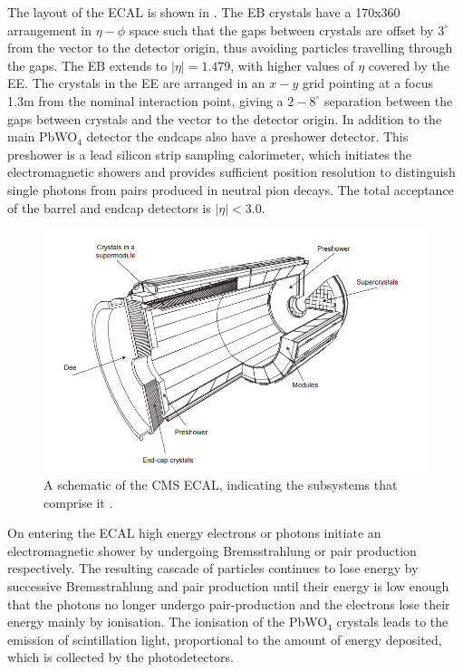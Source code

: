 The layout of the \ac{ECAL} is shown in . The \ac{EB} crystals have a 170x360 arrangement in $\eta-\phi$ space such that the gaps between crystals are offset by $3^{\circ}$ from the vector to the detector origin, thus avoiding particles travelling through the gaps. The \ac{EB} extends to $|\eta|=1.479$, with higher values of $\eta$ covered by the \ac{EE}. The crystals in the \ac{EE} are arranged in an $x-y$ grid pointing at a focus 1.3m from the nominal interaction point, giving a $2-8^{\circ}$ separation between the gaps between crystals and the vector to the detector origin. In addition to the main PbWO$_{4}$ detector the endcaps also have a preshower detector. This preshower is a lead silicon strip sampling calorimeter, which initiates the electromagnetic showers and provides sufficient position resolution to distinguish single photons from pairs produced in neutral pion decays. The total acceptance of the barrel and endcap detectors is $|\eta|<3.0$.

\begin{figure}
  \includegraphics[width=1.2\largefigwidth]{plots/detector/ecal_layout.png}
  \caption{A schematic of the CMS \ac{ECAL}, indicating the subsystems that comprise it \cite{Chatrchyan:2008aa}.}
  \label{fig:ecalschematic}
\end{figure}

 On entering the \ac{ECAL} high energy electrons or photons initiate an electromagnetic shower by undergoing Bremsstrahlung or pair production respectively. The resulting cascade of particles continues to lose energy by successive Bremsstrahlung and pair production until their energy is low enough that the photons no longer undergo pair-production and the electrons lose their energy mainly by ionisation. The ionisation of the PbWO$_{4}$ crystals leads to the emission of scintillation light, proportional to the amount of energy deposited, which is collected by the photodetectors.

